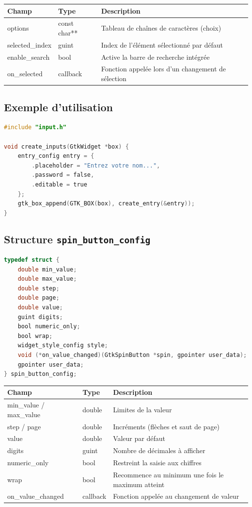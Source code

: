 \begin{center}
\begin{tabular}{|l|l|p{5cm}|}
\hline
\textbf{Champ} & \textbf{Type} & \textbf{Description} \\
\hline
options & const char** & Tableau de chaînes de caractères (choix) \\
\hline
selected\_index & guint & Index de l'élément sélectionné par défaut \\
\hline
enable\_search & bool & Active la barre de recherche intégrée \\
\hline
on\_selected & callback & Fonction appelée lors d'un changement de sélection \\
\hline
\end{tabular}
\end{center}

\subsection{Exemple d'utilisation}
\begin{lstlisting}[language=C]
#include "input.h"

void create_inputs(GtkWidget *box) {
    entry_config entry = {
        .placeholder = "Entrez votre nom...",
        .password = false,
        .editable = true
    };
    gtk_box_append(GTK_BOX(box), create_entry(&entry));
}
\end{lstlisting}
\subsection{Structure \texttt{spin\_button\_config}}
\begin{lstlisting}[language=C]
typedef struct {
    double min_value;
    double max_value;
    double step;
    double page;
    double value;
    guint digits;
    bool numeric_only;
    bool wrap;
    widget_style_config style;
    void (*on_value_changed)(GtkSpinButton *spin, gpointer user_data);
    gpointer user_data;
} spin_button_config;
\end{lstlisting}
\begin{center}
\begin{tabular}{|l|l|>{\raggedright\arraybackslash}p{6cm}|}
\hline
\textbf{Champ} & \textbf{Type} & \textbf{Description} \\
\hline
min\_value / max\_value & double & Limites de la valeur \\
\hline
step / page & double & Incréments (flèches et saut de page) \\
\hline
value & double & Valeur par défaut \\
\hline
digits & guint & Nombre de décimales à afficher \\
\hline
numeric\_only & bool & Restreint la saisie aux chiffres \\
\hline
wrap & bool & Recommence au minimum une fois le maximum atteint \\
\hline
on\_value\_changed & callback & Fonction appelée au changement de valeur \\
\hline
\end{tabular}
\end{center}